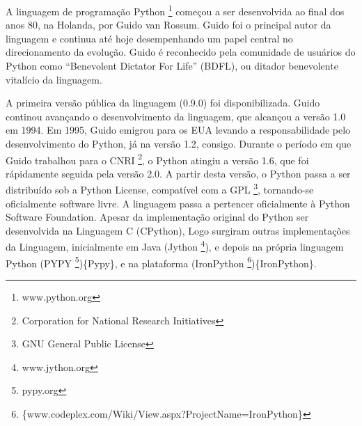 \documentclass[a4paper,10pt,portuguese]{sphinxmanual}
\begin{document}
A linguagem de programação Python \footnote{
www.python.org
} começou a ser desenvolvida ao final dos anos 80, na Holanda, por Guido van Rossum. Guido foi o principal autor da linguagem e continua até hoje desempenhando um papel central no direcionamento da evolução. Guido é reconhecido pela comunidade de usuários do Python como ``Benevolent Dictator For Life'' (BDFL), ou ditador benevolente vitalício da linguagem.

A primeira versão pública da linguagem (0.9.0) foi disponibilizada. Guido continou avançando o desenvolvimento da linguagem, que alcançou a versão 1.0 em 1994. Em 1995, Guido emigrou para os EUA levando a responsabilidade pelo desenvolvimento do Python, já na versão 1.2, consigo. Durante o período em que Guido trabalhou para o CNRI \footnote{
Corporation for National Research Initiatives
}, o Python atingiu a versão 1.6, que foi rápidamente seguida pela versão 2.0. A partir desta versão, o Python passa a ser distribuído sob a Python License, compatível com a GPL \footnote{
GNU General Public License
}, tornando-se oficialmente software livre. A linguagem passa a pertencer oficialmente à Python Software Foundation. Apesar da implementação original do Python ser desenvolvida na Linguagem C (CPython), Logo surgiram outras implementações da Linguagem, inicialmente em Java (Jython \footnote{
www.jython.org
}), e depois na própria linguagem Python (PYPY \footnote{
pypy.org
})\{Pypy\}, e na plataforma  (IronPython \footnote{
\{www.codeplex.com/Wiki/View.aspx?ProjectName=IronPython\}
})\{IronPython\}.
\end{document}
